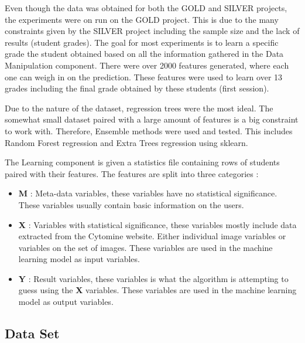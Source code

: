 \documentclass[a4paper,11pt]{report}
\numberwithin{figure}{section} %
\begin{document}
    
    Even though the data was obtained for both the GOLD and SILVER projects, the experiments were on run on the GOLD project. This is due to the many constraints given by the SILVER project including the sample size and the lack of results (student grades). The goal for most experiments is to learn a specific grade the student obtained based on all the information gathered in the Data Manipulation component. There were over 2000 features generated, where each one can weigh in on the prediction. These features were used to learn over 13 grades including the final grade obtained by these students (first session).\newline
    
    
    Due to the nature of the dataset, regression trees were the most ideal. The somewhat small dataset paired with a large amount of features is a big constraint to work with. Therefore, Ensemble methods were used and tested. This includes Random Forest regression and Extra Trees regression using sklearn.\newline
    
    The Learning component is given a statistics file containing rows of students paired with their features. The features are split into three categories :
    \begin{itemize}
\item[\textbullet] \textbf{M} : Meta-data variables, these variables have no statistical significance. These variables usually contain basic information on the users.\\
\item[\textbullet] \textbf{X} : Variables with statistical significance, these variables mostly include data extracted from the Cytomine website. Either individual image variables or variables on the set of images. These variables are used in the machine learning model as input variables.\\
\item[\textbullet] \textbf{Y} : Result variables, these variables is what the algorithm is attempting to guess using the  \textbf{X} variables. These variables are used in the machine learning model as output variables.\\ 
\end{itemize}
    
    
    
    \subsection{Data Set}
    
\end{document}
